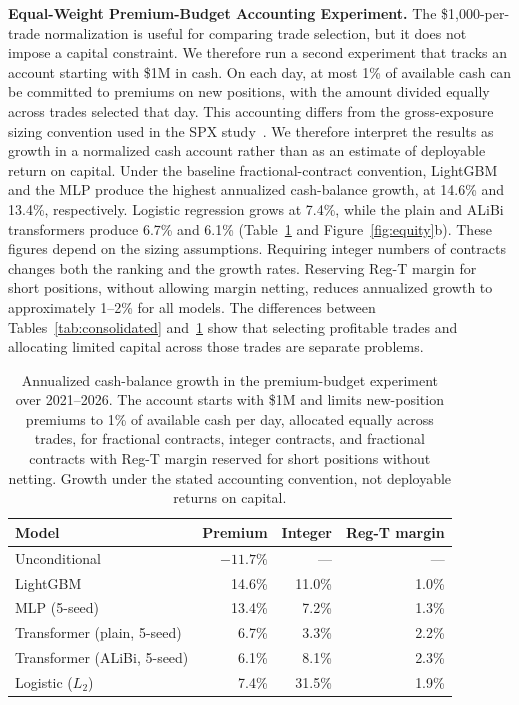 \documentclass[sigconf,review]{acmart}
\begin{document}

\smallskip\noindent\textbf{Equal-Weight Premium-Budget Accounting Experiment.}
\label{sec:capitalscaled}
The \$1{,}000-per-trade normalization is useful for comparing trade selection, but it does not impose a capital constraint. We therefore run a second experiment that tracks an account starting with \$1M in cash. On each day, at most 1\% of available cash can be committed to premiums on new positions, with the amount divided equally across trades selected that day.
This accounting differs from the gross-exposure sizing convention used in the SPX study~\cite{glasserman2025tp2}. We therefore interpret the results as growth in a normalized cash account rather than as an estimate of deployable return on capital.
Under the baseline fractional-contract convention, LightGBM and the MLP produce the highest annualized cash-balance growth, at 14.6\% and 13.4\%, respectively. Logistic regression grows at 7.4\%, while the plain and ALiBi transformers produce 6.7\% and 6.1\% (Table~\ref{tab:capitalscaled} and Figure~\ref{fig:equity}b).
These figures depend on the sizing assumptions. Requiring integer numbers of contracts changes both the ranking and the growth rates. Reserving Reg-T margin for short positions, without allowing margin netting, reduces annualized growth to approximately 1--2\% for all models. The differences between Tables~\ref{tab:consolidated} and~\ref{tab:capitalscaled} show that selecting profitable trades and allocating limited capital across those trades are separate problems.

\begin{table}[tb]
\centering
\footnotesize
\begin{tabular}{lrrr}
\toprule
Model & Premium & Integer & Reg-T margin \\
\midrule
Unconditional & $-11.7\%$ & --- & --- \\
LightGBM & 14.6\% & 11.0\% & 1.0\% \\
MLP (5-seed) & 13.4\% & 7.2\% & 1.3\% \\
Transformer (plain, 5-seed) & 6.7\% & 3.3\% & 2.2\% \\
Transformer (ALiBi, 5-seed) & 6.1\% & 8.1\% & 2.3\% \\
Logistic ($L_2$) & 7.4\% & 31.5\% & 1.9\% \\
\bottomrule
\end{tabular}
\caption{Annualized cash-balance growth in the premium-budget experiment over 2021--2026. The account starts with \$1M and limits new-position premiums to 1\% of available cash per day, allocated equally across trades, for fractional contracts, integer contracts, and fractional contracts with Reg-T margin reserved for short positions without netting. Growth under the stated accounting convention, not deployable returns on capital.}
\label{tab:capitalscaled}
\end{table}
\end{document}
